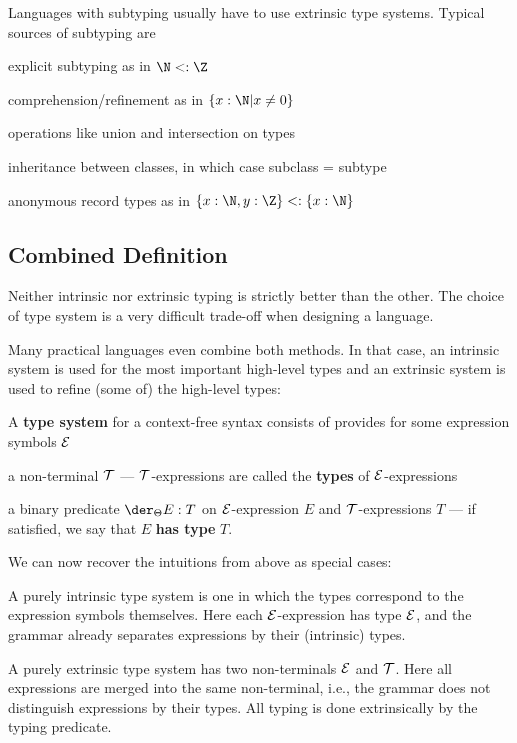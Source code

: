 \begin{remark}[Subtyping]
Languages with subtyping usually have to use extrinsic type systems.
Typical sources of subtyping are
\begin{compactitem}
 \item explicit subtyping as in $\N<:\Z$
 \item comprehension/refinement as in $\{x:\N|x\neq 0\}$
 \item operations like union and intersection on types
 \item inheritance between classes, in which case subclass = subtype
 \item anonymous record types as in $\{x:\N,y:\Z\}<:\{x:\N\}$
\end{compactitem}
\end{remark}

\subsection{Combined Definition}

Neither intrinsic nor extrinsic typing is strictly better than the other.
The choice of type system is a very difficult trade-off when designing a language.

Many practical languages even combine both methods.
In that case, an intrinsic system is used for the most important high-level types and an extrinsic system is used to refine (some of) the high-level types:

\begin{definition}
A \textbf{type system} for a context-free syntax consists of provides for some expression symbols $\mathcal{E}$
 \begin{compactitem}
   \item a non-terminal $\mathcal{T}$ --- $\mathcal{T}$-expressions are called the \textbf{types} of $\mathcal{E}$-expressions
   \item a binary predicate $\der_\Theta E:T$ on $\mathcal{E}$-expression $E$ and $\mathcal{T}$-expressions $T$ --- if satisfied, we say that $E$ \textbf{has type} $T$.
 \end{compactitem}
\end{definition}

We can now recover the intuitions from above as special cases:
\begin{compactitem}
 \item A purely intrinsic type system is one in which the types correspond to the expression symbols themselves.
 Here each $\mathcal{E}$-expression has type $\mathcal{E}$, and the grammar already separates expressions by their (intrinsic) types.
 \item A purely extrinsic type system has two non-terminals $\mathcal{E}$ and $\mathcal{T}$.
  Here all expressions are merged into the same non-terminal, i.e., the grammar does not distinguish expressions by their types.
  All typing is done extrinsically by the typing predicate.
\end{compactitem}

